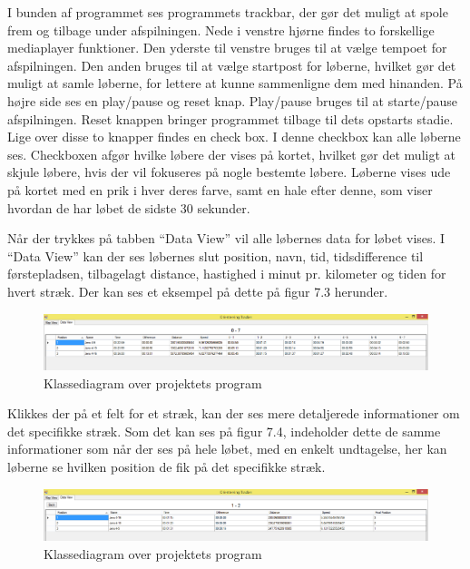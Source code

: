 I bunden af programmet ses programmets trackbar, der gør det muligt at spole frem og tilbage under afspilningen. Nede i venstre hjørne findes to forskellige mediaplayer funktioner. Den yderste til venstre bruges til at vælge tempoet for afspilningen. Den anden bruges til at vælge startpost for løberne, hvilket gør det muligt at samle løberne, for lettere at kunne sammenligne dem med hinanden. På højre side ses en play/pause og  reset knap. Play/pause bruges til at starte/pause afspilningen. Reset knappen bringer programmet tilbage til dets opstarts stadie. Lige over disse to knapper findes en check box. I denne checkbox kan alle løberne ses. Checkboxen afgør hvilke løbere der vises på kortet, hvilket gør det muligt at skjule løbere, hvis der vil fokuseres på nogle bestemte løbere. Løberne vises ude på kortet med en prik i hver deres farve, samt en hale efter denne, som viser hvordan de har løbet de sidste 30 sekunder. 

Når der trykkes på tabben “Data View” vil alle løbernes data for løbet vises. I “Data View” kan der ses løbernes slut position, navn, tid, tidsdifference til førstepladsen, tilbagelagt distance, hastighed i minut pr. kilometer og tiden for hvert stræk. Der kan ses et eksempel på dette på figur 7.3 herunder. 
\begin{figure} [h]
	\centering
	\includegraphics[width=1\textwidth]{billeder/DataView1}
	\caption{Klassediagram over projektets program}
\end{figure}

Klikkes der på et felt for et stræk, kan der ses mere detaljerede informationer om det specifikke stræk. Som det kan ses på figur 7.4, indeholder dette de samme informationer som når der ses på hele løbet, med en enkelt undtagelse, her kan løberne se hvilken position de fik på det specifikke stræk. 
\begin{figure} [h]
	\centering
	\includegraphics[width=1\textwidth]{billeder/DataView2}
	\caption{Klassediagram over projektets program}
\end{figure}

